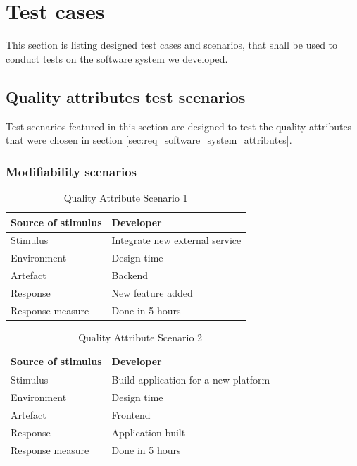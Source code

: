 \documentclass[11pt]{book}
\begin{document}
\section{Test cases} \label{sec:test_cases}

This section is listing designed test cases and scenarios, that shall be used to conduct tests on the software system we developed.

\subsection{Quality attributes test scenarios}\label{sec:qatestscenarios}

Test scenarios featured in this section are designed to test the quality attributes that were chosen in section \ref{sec:req_software_system_attributes}.

\subsubsection{Modifiability scenarios}

\begin{table}[H]
  \centering
  \begin{tabular}{| l | p{11cm} |} \hline
    Source of stimulus   & Developer                                   \\ \hline
    Stimulus             & Integrate new external service              \\ \hline
    Environment          & Design time                                 \\ \hline
    Artefact             & Backend                                     \\ \hline
    Response             & New feature added                           \\ \hline
    Response measure     & Done in 5 hours                             \\ \hline
  \end{tabular}
  \caption{Quality Attribute Scenario 1}
  \label{tab:qas_newservice}
\end{table}

\begin{table}[H]
  \centering
  \begin{tabular}{| l | p{11cm} |} \hline
    Source of stimulus   & Developer                                   \\ \hline
    Stimulus             & Build application for a new platform        \\ \hline
    Environment          & Design time                                 \\ \hline
    Artefact             & Frontend                                    \\ \hline
    Response             & Application built                           \\ \hline
    Response measure     & Done in 5 hours                             \\ \hline
  \end{tabular}
  \caption{Quality Attribute Scenario 2}
  \label{tab:TC_qas_newplatform}
\end{table}
\end{document}

